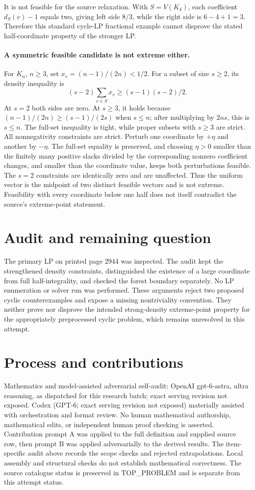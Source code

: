 \documentclass[11pt]{article}
\begin{document}
It is not feasible for the source relaxation. With $S=V(K_4)$,
each coefficient $d_S(v)-1$ equals two, giving left side
$8/3$, while the right side is $6-4+1=3$.
Therefore this standard cycle-LP fractional example cannot disprove
the stated half-coordinate property of the stronger LP.

\paragraph{A symmetric feasible candidate is not extreme either.}
For $K_n$, $n\ge3$, set $x_v=(n-1)/(2n)<1/2$.
For a subset of size $s\ge2$, its density inequality is
\[
(s-2)\sum_{v\in S}x_v\ge(s-1)(s-2)/2.
\]
At $s=2$ both sides are zero. At $s\ge3$, it holds
because $(n-1)/(2n)\ge(s-1)/(2s)$ when $s\le n$;
after multiplying by $2ns$, this is $s\le n$.
The full-set inequality is tight, while proper subsets with
$s\ge3$ are strict. All nonnegativity constraints are strict.
Perturb one coordinate by $+\eta$ and another by $-\eta$.
The full-set equality is preserved, and choosing $\eta>0$
smaller than the finitely many positive slacks divided by the
corresponding nonzero coefficient changes, and smaller than the
coordinate value, keeps both perturbations feasible. The $s=2$
constraints are identically zero and are unaffected. Thus the
uniform vector is the midpoint of two distinct feasible vectors
and is not extreme. Feasibility with every coordinate below one
half does not itself contradict the source's extreme-point statement.

\section{Audit and remaining question}
The primary LP on printed page 2944 was inspected. The audit
kept the strengthened density constraints, distinguished the existence
of a large coordinate from full half-integrality, and checked the
forest boundary separately. No LP enumeration or solver run was
performed. These arguments reject two proposed cyclic counterexamples
and expose a missing nontriviality convention. They neither prove
nor disprove the intended strong-density extreme-point property for
the appropriately preprocessed cyclic problem, which remains unresolved
in this attempt.

\section{Process and contributions}
Mathematics and model-assisted adversarial self-audit: OpenAI gpt-6-astra, ultra reasoning, as dispatched for this research batch; exact serving revision not exposed. Codex (GPT-6; exact serving revision not exposed) materially assisted with orchestration and format review. No human mathematical authorship, mathematical edits, or independent human proof checking is asserted.
Contribution prompt A was applied to the full definition and supplied source row, then prompt B was applied adversarially to the derived results. The item-specific audit above records the scope checks and rejected extrapolations. Local assembly and structural checks do not establish mathematical correctness. The source catalogue status is preserved in TOP\_PROBLEM and is separate from this attempt status.
\end{document}

